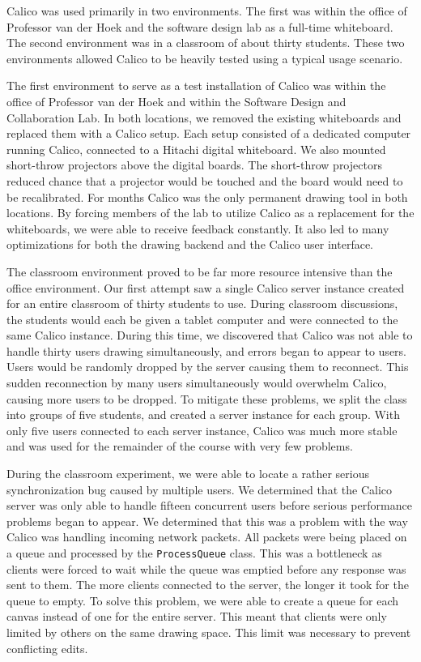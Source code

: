 Calico was used primarily in two environments. The first was within the office of Professor van der Hoek and the software design lab as a full-time whiteboard. The second environment was in a classroom of about thirty students. These two environments allowed Calico to be heavily tested using a typical usage scenario. 

The first environment to serve as a test installation of Calico was within the office of Professor van der Hoek and within the Software Design and Collaboration Lab. In both locations, we removed the existing whiteboards and replaced them with a Calico setup. Each setup consisted of a dedicated computer running Calico, connected to a Hitachi digital whiteboard. We also mounted short-throw projectors above the digital boards. The short-throw projectors reduced chance that a projector would be touched and the board would need to be recalibrated. For months Calico was the only permanent drawing tool in both locations. By forcing members of the lab to utilize Calico as a replacement for the whiteboards, we were able to receive feedback constantly. It also led to many optimizations for both the drawing backend and the Calico user interface.


The classroom environment proved to be far more resource intensive than the office environment. Our first attempt saw a single Calico server instance created for an entire classroom of thirty students to use. During classroom discussions, the students would each be given a tablet computer and were connected to the same Calico instance. During this time, we discovered that Calico was not able to handle thirty users drawing simultaneously, and errors began to appear to users. Users would be randomly dropped by the server causing them to reconnect. This sudden reconnection by many users simultaneously would overwhelm Calico, causing more users to be dropped.  To mitigate these problems, we split the class into groups of five students, and created a server instance for each group. With only five users connected to each server instance, Calico was much more stable and was used for the remainder of the course with very few problems.

During the classroom experiment, we were able to locate a rather serious synchronization bug caused by multiple users. We determined that the Calico server was only able to handle fifteen concurrent users before serious performance problems began to appear. We determined that this was a problem with the way Calico was handling incoming network packets. All packets were being placed on a queue and processed by the \texttt{ProcessQueue} class. This was a bottleneck as clients were forced to wait while the queue was emptied before any response was sent to them. The more clients connected to the server, the longer it took for the queue to empty. To solve this problem, we were able to create a queue for each canvas instead of one for the entire server. This meant that clients were only limited by others on the same drawing space. This limit was necessary to prevent conflicting edits.

